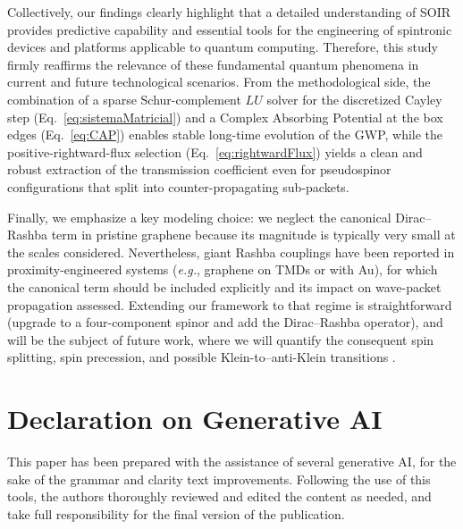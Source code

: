 \documentclass{../assets/templates/iopjournal}
\begin{document}
    Collectively, our findings clearly highlight that a detailed understanding of SOIR provides predictive capability and essential tools for the engineering of spintronic devices and platforms applicable to quantum computing.
    Therefore, this study firmly reaffirms the relevance of these fundamental quantum phenomena in current and future technological scenarios.
    From the methodological side, the combination of a sparse Schur-complement $LU$ solver for the discretized Cayley step (Eq.~\eqref{eq:sistemaMatricial}) and a Complex Absorbing Potential at the box edges (Eq.~\eqref{eq:CAP}) enables stable long-time evolution of the GWP, while the positive-rightward-flux selection (Eq.~\eqref{eq:rightwardFlux}) yields a clean and robust extraction of the transmission coefficient even for pseudospinor configurations that split into counter-propagating sub-packets.
    
    Finally, we emphasize a key modeling choice: we neglect the canonical Dirac–Rashba term in pristine graphene because its magnitude is typically very small at the scales considered.
    Nevertheless, giant Rashba couplings have been reported in proximity-engineered systems (\textit{e.g.}, graphene on TMDs or with Au), for which the canonical term should be included explicitly and its impact on wave-packet propagation assessed.
    Extending our framework to that regime is straightforward (upgrade to a four-component spinor and add the Dirac–Rashba operator), and will be the subject of future work, where we will quantify the consequent spin splitting, spin precession, and possible Klein-to–anti-Klein transitions \cite{AvsarNatCommun2014, WangPhysRevX2016, DellAnnaJPhysCondMatt2018}.


\section*{Declaration on Generative AI}
\label{sec:genai}

This paper has been prepared with the assistance of several generative AI, for the sake of the grammar and clarity text improvements. Following the use of this tools, the authors thoroughly reviewed and edited the content as needed, and take full responsibility for the final version of the publication.



\end{document}
